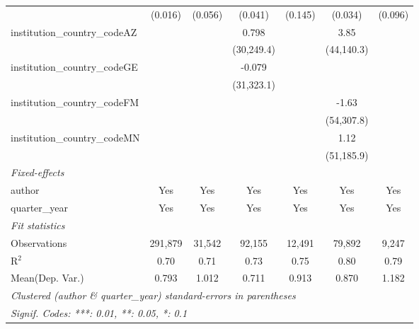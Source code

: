 \begin{tabular}{lcccccc}
                                         & (0.016)        & (0.056)       & (0.041)        & (0.145)        & (0.034)        & (0.096)\\   
   institution\_country\_codeAZ          &                &               & 0.798          &                & 3.85           &   \\   
                                         &                &               & (30,249.4)     &                & (44,140.3)     &   \\   
   institution\_country\_codeGE          &                &               & -0.079         &                &                &   \\   
                                         &                &               & (31,323.1)     &                &                &   \\   
   institution\_country\_codeFM          &                &               &                &                & -1.63          &   \\   
                                         &                &               &                &                & (54,307.8)     &   \\   
   institution\_country\_codeMN          &                &               &                &                & 1.12           &   \\   
                                         &                &               &                &                & (51,185.9)     &   \\   
   \midrule
   \emph{Fixed-effects}\\
   author                                & Yes            & Yes           & Yes            & Yes            & Yes            & Yes\\  
   quarter\_year                         & Yes            & Yes           & Yes            & Yes            & Yes            & Yes\\  
   \midrule
   \emph{Fit statistics}\\
   Observations                          & 291,879        & 31,542        & 92,155         & 12,491         & 79,892         & 9,247\\  
   R$^2$                                 & 0.70           & 0.71          & 0.73           & 0.75           & 0.80           & 0.79\\  
Mean(Dep. Var.) & 0.793 & 1.012 & 0.711 & 0.913 & 0.870 & 1.182 \\
   \midrule \midrule
   \multicolumn{7}{l}{\emph{Clustered (author \& quarter\_year) standard-errors in parentheses}}\\
   \multicolumn{7}{l}{\emph{Signif. Codes: ***: 0.01, **: 0.05, *: 0.1}}\\
\end{tabular}
\par\endgroup
